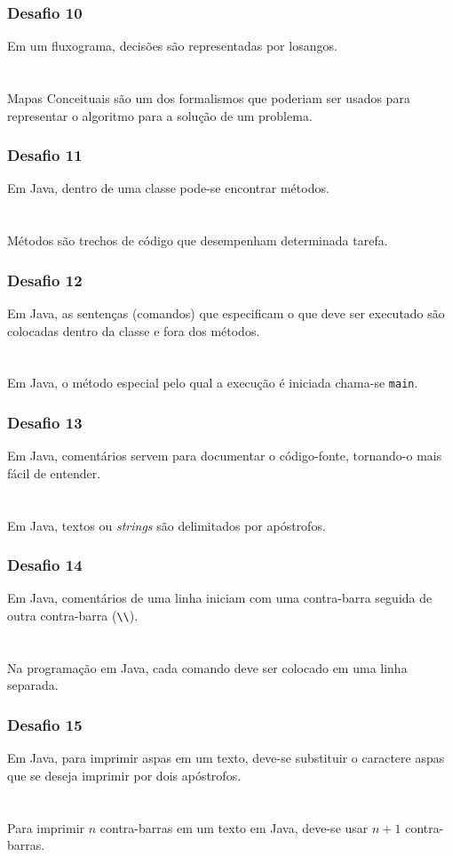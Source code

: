 \documentclass[aspectratio=169]{beamer}
\begin{document}
\begin{frame}\frametitle{Desafio 10}
Em um fluxograma, decisões são representadas por losangos.\\
~\\
~\\
Mapas Conceituais são um dos formalismos que poderiam ser usados para representar o algoritmo para a solução de um problema.
\end{frame}

\begin{frame}\frametitle{Desafio 11}
Em Java, dentro de uma classe pode-se encontrar métodos.\\
~\\
~\\
Métodos são trechos de código que desempenham determinada tarefa.	
\end{frame}

\begin{frame}\frametitle{Desafio 12}
Em Java, as sentenças (comandos) que especificam o que deve ser executado são colocadas dentro da classe e fora dos métodos.\\
~\\
~\\
Em Java, o método especial pelo qual a execução é iniciada chama-se \texttt{main}.
\end{frame}

\begin{frame}\frametitle{Desafio 13}
Em Java, comentários servem para documentar o código-fonte, tornando-o mais fácil de entender.\\
~\\
~\\
Em Java, textos ou \emph{strings} são delimitados por apóstrofos.
\end{frame}

\begin{frame}\frametitle{Desafio 14}
Em Java, comentários de uma linha iniciam com uma contra-barra seguida de outra contra-barra (\texttt{\textbackslash\textbackslash}).\\
~\\
~\\
Na programação em Java, cada comando deve ser colocado em uma linha separada.
\end{frame}

\begin{frame}\frametitle{Desafio 15}
Em Java, para imprimir aspas em um texto, deve-se substituir o caractere aspas que se deseja imprimir por dois apóstrofos.\\
~\\
~\\
Para imprimir $n$ contra-barras em um texto em Java, deve-se usar $n+1$ contra-barras.
\end{frame}

\end{document}
